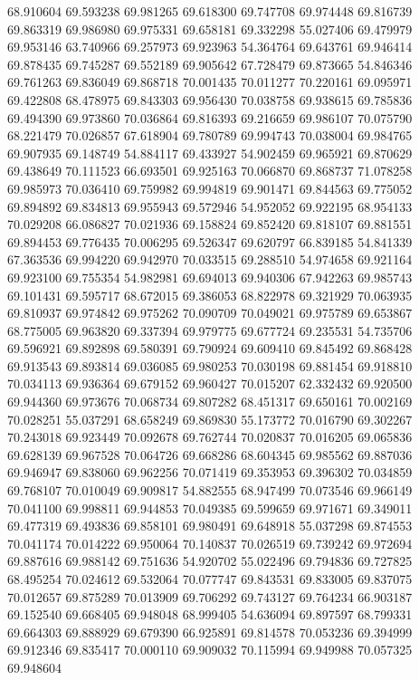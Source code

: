 68.910604
69.593238
69.981265
69.618300
69.747708
69.974448
69.816739
69.863319
69.986980
69.975331
69.658181
69.332298
55.027406
69.479979
69.953146
63.740966
69.257973
69.923963
54.364764
69.643761
69.946414
69.878435
69.745287
69.552189
69.905642
67.728479
69.873665
54.846346
69.761263
69.836049
69.868718
70.001435
70.011277
70.220161
69.095971
69.422808
68.478975
69.843303
69.956430
70.038758
69.938615
69.785836
69.494390
69.973860
70.036864
69.816393
69.216659
69.986107
70.075790
68.221479
70.026857
67.618904
69.780789
69.994743
70.038004
69.984765
69.907935
69.148749
54.884117
69.433927
54.902459
69.965921
69.870629
69.438649
70.111523
66.693501
69.925163
70.066870
69.868737
71.078258
69.985973
70.036410
69.759982
69.994819
69.901471
69.844563
69.775052
69.894892
69.834813
69.955943
69.572946
54.952052
69.922195
68.954133
70.029208
66.086827
70.021936
69.158824
69.852420
69.818107
69.881551
69.894453
69.776435
70.006295
69.526347
69.620797
66.839185
54.841339
67.363536
69.994220
69.942970
70.033515
69.288510
54.974658
69.921164
69.923100
69.755354
54.982981
69.694013
69.940306
67.942263
69.985743
69.101431
69.595717
68.672015
69.386053
68.822978
69.321929
70.063935
69.810937
69.974842
69.975262
70.090709
70.049021
69.975789
69.653867
68.775005
69.963820
69.337394
69.979775
69.677724
69.235531
54.735706
69.596921
69.892898
69.580391
69.790924
69.609410
69.845492
69.868428
69.913543
69.893814
69.036085
69.980253
70.030198
69.881454
69.918810
70.034113
69.936364
69.679152
69.960427
70.015207
62.332432
69.920500
69.944360
69.973676
70.068734
69.807282
68.451317
69.650161
70.002169
70.028251
55.037291
68.658249
69.869830
55.173772
70.016790
69.302267
70.243018
69.923449
70.092678
69.762744
70.020837
70.016205
69.065836
69.628139
69.967528
70.064726
69.668286
68.604345
69.985562
69.887036
69.946947
69.838060
69.962256
70.071419
69.353953
69.396302
70.034859
69.768107
70.010049
69.909817
54.882555
68.947499
70.073546
69.966149
70.041100
69.998811
69.944853
70.049385
69.599659
69.971671
69.349011
69.477319
69.493836
69.858101
69.980491
69.648918
55.037298
69.874553
70.041174
70.014222
69.950064
70.140837
70.026519
69.739242
69.972694
69.887616
69.988142
69.751636
54.920702
55.022496
69.794836
69.727825
68.495254
70.024612
69.532064
70.077747
69.843531
69.833005
69.837075
70.012657
69.875289
70.013909
69.706292
69.743127
69.764234
66.903187
69.152540
69.668405
69.948048
68.999405
54.636094
69.897597
68.799331
69.664303
69.888929
69.679390
66.925891
69.814578
70.053236
69.394999
69.912346
69.835417
70.000110
69.909032
70.115994
69.949988
70.057325
69.948604
